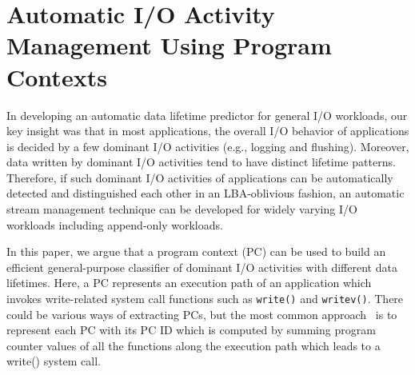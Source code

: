 \section{Automatic I/O Activity Management Using Program Contexts}


{\color{blue}
In developing an automatic data lifetime predictor for general I/O workloads,
our key insight was that in most applications,}
the overall I/O behavior of 
applications is decided by a few dominant
I/O activities (e.g., logging and flushing). Moreover, 
data written by dominant I/O activities tend to have distinct lifetime patterns.
Therefore, if such dominant I/O activities of applications can be 
{\color{blue}
automatically detected and distinguished each other in an LBA-oblivious fashion, 
an automatic stream management technique can be developed for widely varying I/O workloads 
including append-only workloads.}

In this paper, we argue that a program context (PC) can be
used to build an efficient general-purpose 
{\color{blue}classifier of dominant I/O activities with different data lifetimes.}
Here, a PC
represents an execution path of an application which invokes write-related
system call functions such as {\tt write()} and {\tt writev()}.  
There could be various ways of extracting PCs, 
but the most common approach~\cite{PC, PC2} is to
represent each PC with its PC ID which is computed by summing 
program counter values of all the functions along the execution path which
leads to a write() system call.

